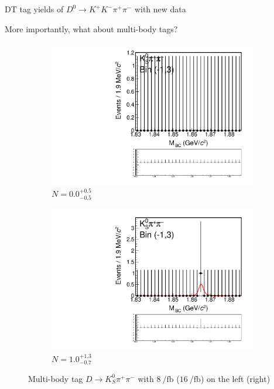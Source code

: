 \documentclass{beamer}
\begin{document}
\begin{frame}{DT tag yields of $D^0\to K^+K^-\pi^+\pi^-$ with new data}
  \begin{center}
    {\large More importantly, what about multi-body tags?}
  \end{center}
  \vspace{0.1cm}
  \begin{figure}
    \centering
    \begin{subfigure}{0.45\textwidth}
      \includegraphics[width = 1.0\textwidth,trim={0 4.9cm 0 0},clip=true]{Plots/DoubleTagYield_DoubleTag_SCMB_KKpipi_vs_KSpipi_SignalBinM1_TagBin3_8invfb.pdf}
      \caption{$N = 0.0^{+0.5}_{-0.5}$}
    \end{subfigure}%
    \hspace{1cm}
    \begin{subfigure}{0.45\textwidth}
      \includegraphics[width = 1.0\textwidth,trim={0 4.9cm 0 0},clip=true]{Plots/DoubleTagYield_DoubleTag_SCMB_KKpipi_vs_KSpipi_SignalBinM1_TagBin3_16invfb.pdf}
      \caption{$N = 1.0^{+1.3}_{-0.7}$}
    \end{subfigure}
    \caption{Multi-body tag $D\to K_S^0\pi^+\pi^-$ with $\SI{8}{\per\femto\barn}$ ($\SI{16}{\per\femto\barn}$) on the left (right)}
  \end{figure}
\end{frame}
\end{document}

